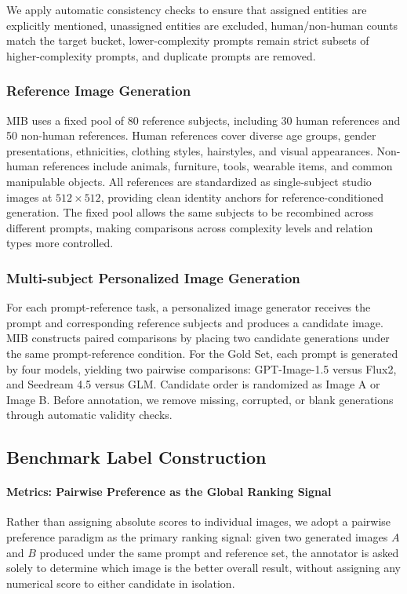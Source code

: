 \documentclass{article}
\begin{document}
We apply automatic consistency checks to ensure that assigned entities are explicitly mentioned, unassigned entities are excluded, human/non-human counts match the target bucket, lower-complexity prompts remain strict subsets of higher-complexity prompts, and duplicate prompts are removed.

\subsubsection{Reference Image Generation}
MIB uses a fixed pool of 80 reference subjects, including 30 human references and 50 non-human references. Human references cover diverse age groups, gender presentations, ethnicities, clothing styles, hairstyles, and visual appearances. Non-human references include animals, furniture, tools, wearable items, and common manipulable objects. All references are standardized as single-subject studio images at $512 \times 512$, providing clean identity anchors for reference-conditioned generation. The fixed pool allows the same subjects to be recombined across different prompts, making comparisons across complexity levels and relation types more controlled.

\subsubsection{Multi-subject Personalized Image Generation}
For each prompt-reference task, a personalized image generator receives the prompt and corresponding reference subjects and produces a candidate image. MIB constructs paired comparisons by placing two candidate generations under the same prompt-reference condition. For the Gold Set, each prompt is generated by four models, yielding two pairwise comparisons: GPT-Image-1.5 versus Flux2, and Seedream 4.5 versus GLM. Candidate order is randomized as Image A or Image B. Before annotation, we remove missing, corrupted, or blank generations through automatic validity checks.

\subsection{Benchmark Label Construction}

\paragraph{Metrics: Pairwise Preference as the Global Ranking Signal}
Rather than assigning absolute scores to individual images, we adopt a pairwise preference paradigm as the primary ranking signal: given two generated images $A$ and $B$ produced under the same prompt and reference set, the annotator is asked solely to determine which image is the better overall result, without assigning any numerical score to either candidate in isolation.
\end{document}
